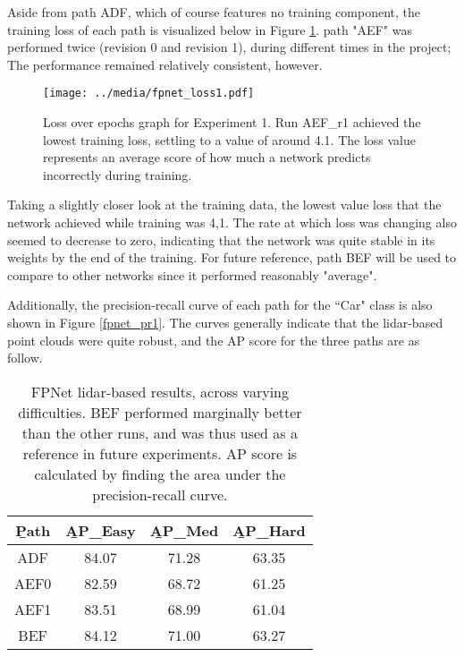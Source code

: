 Aside from path ADF, which of course features no training component, the training loss of each path is visualized below in Figure \ref{fpnet_loss1}. path "AEF" was performed twice (revision 0 and revision 1), during different times in the project; The performance remained relatively consistent, however.

\begin{figure}[H]
	\centering
	\texttt{[image: ../media/fpnet\_loss1.pdf]}
	\caption{Loss over epochs graph for Experiment 1. Run AEF\_r1 achieved the lowest training loss, settling to a value of around 4.1. The loss value represents an average score of how much a network predicts incorrectly during training.}
	\label{fpnet_loss1}
\end{figure}

Taking a slightly closer look at the training data, the lowest value loss that the network achieved while training was 4,1. The rate at which loss was changing also seemed to decrease to zero, indicating that the network was quite stable in its weights by the end of the training. For future reference, path BEF will be used to compare to other networks since it performed reasonably "average".

Additionally, the precision-recall curve of each path for the ``Car" class is also shown in Figure \ref{fpnet_pr1}. The curves generally indicate that the lidar-based point clouds were quite robust, and the AP score for the three paths are as follow.

\begin{table}[ht]
	\centering
	\caption{FPNet lidar-based results, across varying difficulties. BEF performed marginally better than the other runs, and was thus used as a reference in future experiments. AP score is calculated by finding the area under the precision-recall curve.}
	\begin{tabular}{|c|c|c|c|}
		\hline
		\b{Path} & \b{AP\_Easy} & \b{AP\_Med} & \b{AP\_Hard} \\ \hline
		  ADF    &    84.07     &    71.28    &    63.35     \\ \hline
		  AEF0   &    82.59     &    68.72    &    61.25     \\ \hline
		  AEF1   &    83.51     &    68.99    &    61.04     \\ \hline
		  BEF    &    84.12     &    71.00    &    63.27     \\ \hline
	\end{tabular}
	\label{fpnet_ap1}
\end{table}


